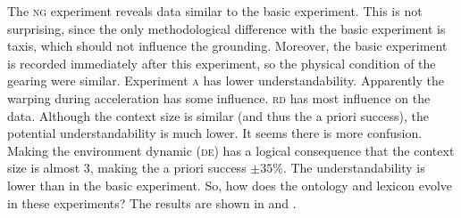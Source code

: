 The {\scshape ng} experiment reveals data similar to the basic experiment. This is not surprising, since the only methodological difference with the basic experiment is taxis, which should not influence the grounding. Moreover, the basic experiment is recorded immediately after this experiment, so the physical condition of the gearing were similar. Experiment {\scshape a} has lower understandability. Apparently the warping during acceleration has some influence. {\scshape rd} has most influence on the data. Although the context size is similar (and thus the a priori success), the potential understandability is much lower. It seems there is more confusion. Making the environment dynamic {\scshape (de)} has a logical consequence that the context size is almost 3, making the a priori success $\pm 35$\%. The understandability is lower than in the basic experiment. So, how does the ontology and lexicon evolve in these experiments? The results are shown in  and .

